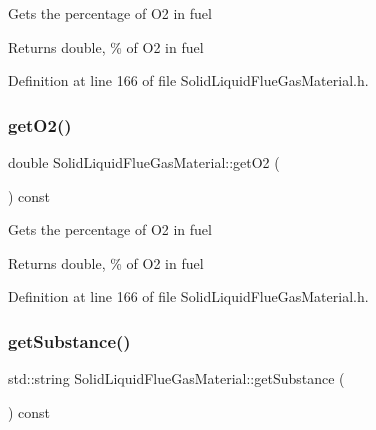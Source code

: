 Gets the percentage of O2 in fuel \begin{DoxyReturn}{Returns}
double, \% of O2 in fuel 
\end{DoxyReturn}


Definition at line 166 of file Solid\+Liquid\+Flue\+Gas\+Material.\+h.

\mbox{\label{class_solid_liquid_flue_gas_material_a08d588e576f605d3f9925cb649e1105e}} 
\subsubsection{\texorpdfstring{get\+O2()}{getO2()}\hspace{0.1cm}{\footnotesize\ttfamily [3/3]}}
{\footnotesize\ttfamily double Solid\+Liquid\+Flue\+Gas\+Material\+::get\+O2 (\begin{DoxyParamCaption}{ }\end{DoxyParamCaption}) const\hspace{0.3cm}{\ttfamily [inline]}}

Gets the percentage of O2 in fuel \begin{DoxyReturn}{Returns}
double, \% of O2 in fuel 
\end{DoxyReturn}


Definition at line 166 of file Solid\+Liquid\+Flue\+Gas\+Material.\+h.

\mbox{\label{class_solid_liquid_flue_gas_material_a6e07a23fb05c15c7e5dba39334988de8}} 
\subsubsection{\texorpdfstring{get\+Substance()}{getSubstance()}\hspace{0.1cm}{\footnotesize\ttfamily [1/3]}}
{\footnotesize\ttfamily std\+::string Solid\+Liquid\+Flue\+Gas\+Material\+::get\+Substance (\begin{DoxyParamCaption}{ }\end{DoxyParamCaption}) const\hspace{0.3cm}{\ttfamily [inline]}}

